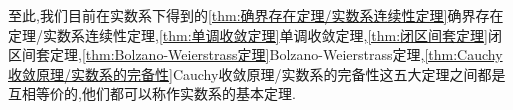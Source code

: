 \begin{red}
    \begin{remark}
       至此,我们目前在实数系下得到的\cref{thm:确界存在定理/实数系连续性定理}确界存在定理/实数系连续性定理,\cref{thm:单调收敛定理}单调收敛定理,\cref{thm:闭区间套定理}闭区间套定理,\cref{thm:Bolzano-Weierstrass定理}\textup{Bolzano-Weierstrass}定理,\cref{thm:Cauchy收敛原理/实数系的完备性}\textup{Cauchy}收敛原理/实数系的完备性这五大定理之间都是互相等价的,他们都可以称作实数系的基本定理.
    \end{remark}
\end{red}